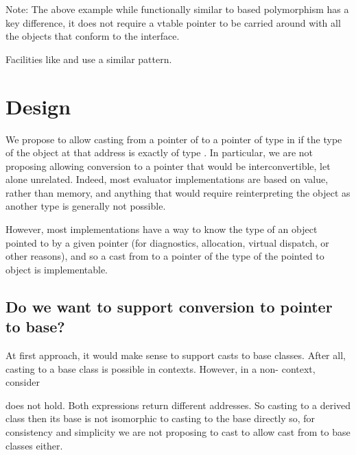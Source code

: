 \documentclass{wg21}
\begin{document}
    Note: The above example while functionally similar to  based polymorphism has a key difference, it does not require a vtable pointer to be carried around with all the objects that conform to the interface.

    Facilities like  and  use a similar pattern.

    \section{Design}

    We propose to allow casting from a pointer of  to a pointer of type  in  if the type of the object at that address is exactly of type .
    In particular, we are not proposing allowing conversion to a pointer that would be interconvertible, let alone unrelated.
    Indeed, most  evaluator implementations are based on value, rather than memory, and anything that would require reinterpreting the object as another type is generally not possible.

    However, most implementations have a way to know the type of an object pointed to by a given pointer (for diagnostics,  allocation, virtual dispatch, or other reasons), and so a cast from  to a pointer of the type of the pointed to object is implementable.

    \subsection{Do we want to support conversion to pointer to base?}

    At first approach, it would make sense to support casts to base classes.
    After all, casting to a base class is possible in  contexts.
    However, in a non- context, consider


     does not hold. Both expressions return different addresses.
    So casting to a derived class then its base is not isomorphic to casting to the base directly so, for consistency and simplicity we are not proposing
    to cast to allow cast from  to base classes either.
\end{document}
